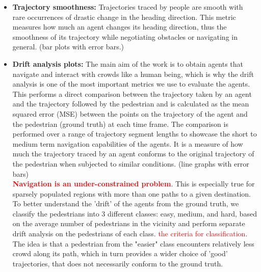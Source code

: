 \begin{itemize}
        \item \textbf{Trajectory smoothness:} Trajectories traced by people are smooth with rare occurrences of drastic change in the heading direction. This metric measures how much an agent changes its heading direction, thus the smoothness of its trajectory while negotiating obstacles or navigating in general. (bar plots with error bars.)
        \item \textbf{Drift analysis plots: }The main aim of the work is to obtain agents that navigate and interact with crowds like a human being, which is why the drift analysis is one of the most important metrics we use to evaluate the agents. This performs a direct comparison between the trajectory taken by an agent and the trajectory followed by the pedestrian and is calculated as the mean squared error (MSE) between the points on the trajectory of the agent and the pedestrian (ground truth) at each time frame. The comparison is performed over a range of trajectory segment lengths to showcase the short to medium term navigation capabilities of the agents. It is a measure of how much the trajectory traced by an agent conforms to the original trajectory of the pedestrian when subjected to similar conditions. (line graphs with error bars)\\
        \textbf{\textcolor{red}{Navigation is an under-constrained problem}}. This is especially true for sparsely populated regions with more than one paths to a given destination. To better understand the 'drift' of the agents from the ground truth, we classify the pedestrians into 3 different classes: easy, medium, and hard, based on the average number of pedestrians in the vicinity and perform separate drift analysis on the pedestrians of each class. \textcolor{red}{the criteria for classification}. The idea is that a pedestrian from the "easier" class encounters relatively less crowd along its path, which in turn provides a wider choice of 'good' trajectories, that does not necessarily conform to the ground truth. 
\end{itemize}

